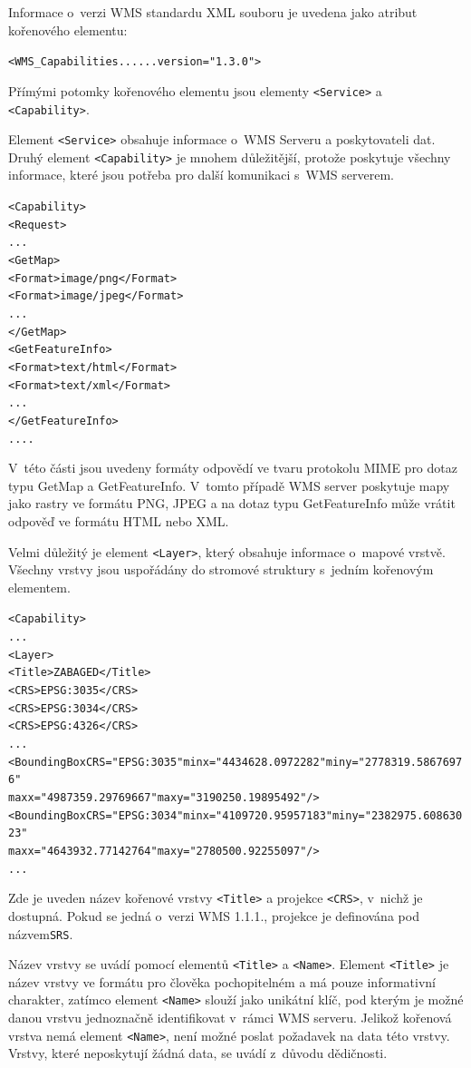 \documentclass[a4paper,12pt]{article}
\begin{document}
Informace o~verzi WMS standardu  XML souboru je uvedena jako atribut kořenového
elementu:
\begin{alltt}\footnotesize
<WMS_Capabilities...    ...version="1.3.0">
\end{alltt}

Přímými potomky kořenového elementu jsou elementy {\tt <Service>} a
{\tt <Capability>}.

Element {\tt <Service>} obsahuje informace o~WMS Serveru a poskytovateli
dat.  Druhý element {\tt <Capability>} je mnohem důležitější, protože
poskytuje všechny informace, které jsou potřeba pro další komunikaci
s~WMS serverem.
\begin{alltt}\footnotesize
<Capability>
    <Request>
          ...
       <GetMap>
            <Format>image/png</Format>
            <Format>image/jpeg</Format>
          ...
       </GetMap>	
       <GetFeatureInfo>
            <Format>text/html</Format>
            <Format>text/xml</Format>
              ...
       </GetFeatureInfo>
           ....
\end{alltt}
V~této části jsou uvedeny formáty odpovědí ve tvaru protokolu MIME pro
dotaz typu GetMap a GetFeatureInfo. V~tomto případě WMS server
poskytuje mapy jako rastry ve formátu PNG, JPEG a na dotaz typu
GetFeatureInfo může vrátit odpověď ve formátu HTML nebo XML.

Velmi důležitý je element {\tt <Layer>}, který obsahuje informace o~mapové
vrstvě. Všechny vrstvy jsou uspořádány do stromové struktury s~jedním
kořenovým elementem.
\begin{alltt}\footnotesize
<Capability>
    ...
  <Layer>
   <Title>ZABAGED</Title>
     <CRS>EPSG:3035</CRS>
     <CRS>EPSG:3034</CRS>
     <CRS>EPSG:4326</CRS>
      ...
     <BoundingBox CRS="EPSG:3035" minx="4434628.0972282" miny="2778319.58676976"
                                  maxx="4987359.29769667" maxy="3190250.19895492"/>
     <BoundingBox CRS="EPSG:3034" minx="4109720.95957183" miny="2382975.60863023"
                                  maxx="4643932.77142764" maxy="2780500.92255097"/>
      ...
\end{alltt}
Zde je uveden název kořenové vrstvy {\tt <Title>} a projekce {\tt <CRS>}, v~nichž
je dostupná. Pokud se jedná o~verzi WMS 1.1.1., projekce je 
definována pod názvem{\tt SRS}. 

 Název vrstvy se uvádí pomocí elementů {\tt <Title>} a
{\tt <Name>}. Element {\tt <Title>} je název vrstvy ve formátu pro člověka
pochopitelném a má pouze informativní charakter, zatímco element
{\tt <Name>} slouží jako unikátní klíč, pod kterým je možné danou vrstvu
jednoznačně identifikovat v~rámci WMS serveru. Jelikož kořenová vrstva
nemá element {\tt <Name>}, není možné poslat požadavek na data této
vrstvy. Vrstvy, které neposkytují žádná data, se uvádí z~důvodu
dědičnosti.
\end{document}
